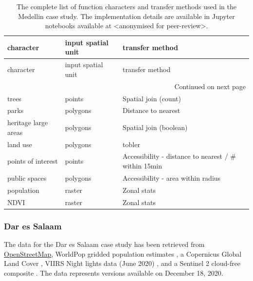 \begin{longtable}{p{5cm}p{3cm}p{5cm}}
\caption{The complete list of function characters and transfer methods used in the Medellin case study. The implementation details are available
in Jupyter notebooks available at <anonymised for peer-review>.}
\label{tab:fn_med} \\
\toprule
                                            character & input spatial unit &                                    transfer method \\
\midrule
\endfirsthead

\toprule
                                            character & input spatial unit &                                    transfer method \\
\midrule
\endhead
\midrule
\multicolumn{3}{r}{{Continued on next page}} \\
\midrule
\endfoot

\bottomrule
\endlastfoot
                trees &   points &                               Spatial join (count) \\
                parks & polygons &                                Distance to nearest \\
heritage large areas & polygons &                               Spatial join (boolean) \\
            land use & polygons &                                             tobler \\
              points of interest &   points & Accessibility  - distance to nearest / \# within 15min \\
        public spaces & polygons &             Accessibility  -  area within radius \\
            population &   raster &                                        Zonal stats \\
                NDVI &   raster &                                        Zonal stats \\
\end{longtable}

\subsubsection{Dar es Salaam}

The data for the Dar es Salaam case study has been retrieved from
\href{https://osm.org}{OpenStreetMap}, WorldPop gridded population estimates
\citep{bondarenko2020census}, a Copernicus Global Land Cover
\citep{marcel_buchhorn_2020_3939050}, VIIRS Night lights data (June 2020) \citep{elvidge2013viirs},
and a Sentinel 2 cloud-free composite \citep{CORBANE2020105737}. The data represents
versions available on December 18, 2020.


